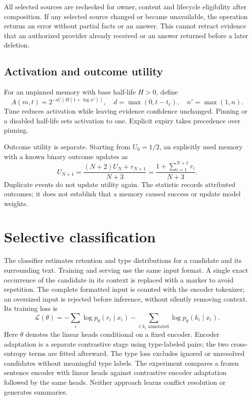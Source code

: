 \documentclass[11pt]{article}
\begin{document}
All selected sources are rechecked for owner, content and lifecycle eligibility after composition. If any selected source changed or became unavailable, the operation returns an error without partial facts or an answer. This cannot retract evidence that an authorized provider already received or an answer returned before a later deletion.

\subsection{Activation and outcome utility}
For an unpinned memory with base half-life $H>0$, define
\[
 A(m,t)=2^{-d/(H(1+\log n'))},\quad
 d=\max(0,t-t_\ell),\quad n'=\max(1,n).
\]
Time reduces activation while leaving evidence confidence unchanged. Pinning or a disabled half-life sets activation to one. Explicit expiry takes precedence over pinning.

Outcome utility is separate. Starting from $U_0=1/2$, an explicitly used memory with a known binary outcome updates as
\[
 U_{N+1}=\frac{(N+2)U_N+r_{N+1}}{N+3}
        =\frac{1+\sum_{i=1}^{N+1}r_i}{N+3}.
\]
Duplicate events do not update utility again. The statistic records attributed outcomes; it does not establish that a memory caused success or update model weights.

\section{Selective classification}
The classifier estimates retention and type distributions for a candidate and its surrounding text. Training and serving use the same input format. A single exact occurrence of the candidate in its context is replaced with a marker to avoid repetition. The complete formatted input is counted with the encoder tokenizer; an oversized input is rejected before inference, without silently removing context. Its training loss is
\[
 \mathcal{L}(\theta)=
 -\sum_i\log p_\theta(r_i\mid x_i)
 -\sum_{i:k_i\text{ annotated}}\log p_\theta(k_i\mid x_i).
\]
Here $\theta$ denotes the linear heads conditional on a fixed encoder. Encoder adaptation is a separate contrastive stage using type-labeled pairs; the two cross-entropy terms are fitted afterward. The type loss excludes ignored or unresolved candidates without meaningful type labels. The experiment compares a frozen sentence encoder with linear heads against contrastive encoder adaptation followed by the same heads. Neither approach learns conflict resolution or generates summaries.
\end{document}
